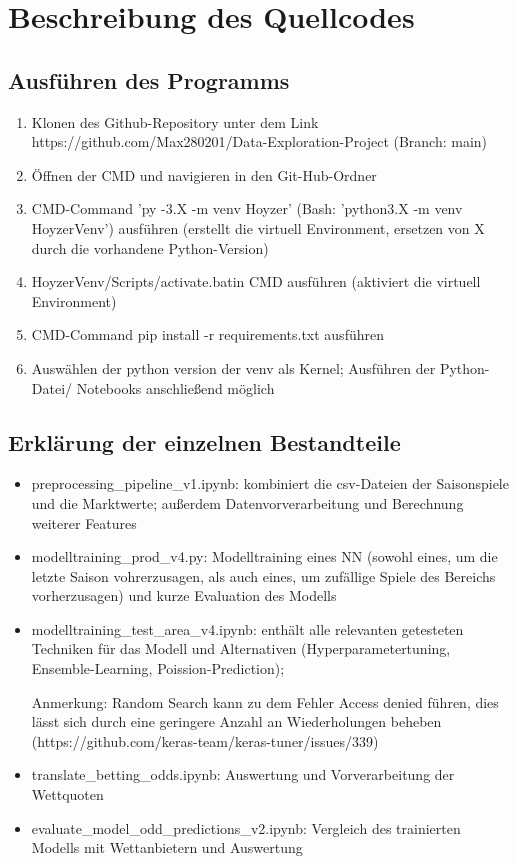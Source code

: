 \chapter{Beschreibung des Quellcodes}
\section{Ausführen des Programms}
\begin{enumerate}
	\item Klonen des Github-Repository unter dem Link https://github.com/Max280201/Data-Exploration-Project (Branch: main)
	\item Öffnen der CMD und navigieren in den Git-Hub-Ordner
	\item CMD-Command 'py -3.X -m venv Hoyzer' (Bash: 'python3.X -m venv HoyzerVenv') ausführen (erstellt die virtuell Environment, ersetzen von X durch die vorhandene Python-Version)
	\item \grqq HoyzerVenv/Scripts/activate.bat\grqq in CMD ausführen (aktiviert die virtuell Environment)
	\item CMD-Command \grqq pip install -r requirements.txt\grqq{} ausführen
	\item Auswählen der python version der venv als Kernel; Ausführen der Python-Datei/ Notebooks anschließend möglich
\end{enumerate}

\section{Erklärung der einzelnen Bestandteile}
\begin{itemize}
	\item preprocessing\_pipeline\_v1.ipynb: kombiniert die csv-Dateien der Saisonspiele und die Marktwerte; außerdem Datenvorverarbeitung und Berechnung weiterer Features
	\item modelltraining\_prod\_v4.py: Modelltraining eines NN (sowohl eines, um die letzte Saison vohrerzusagen, als auch eines, um zufällige Spiele des Bereichs vorherzusagen) und kurze Evaluation des Modells
	\item modelltraining\_test\_area\_v4.ipynb: enthält alle relevanten getesteten Techniken für das Modell und Alternativen (Hyperparametertuning, Ensemble-Learning, Poission-Prediction);
	
	Anmerkung: Random Search kann zu dem Fehler \grqq Access denied\grqq{} führen, dies lässt sich durch eine geringere Anzahl an Wiederholungen beheben (https://github.com/keras-team/keras-tuner/issues/339)
	
	\item translate\_betting\_odds.ipynb: Auswertung und Vorverarbeitung der Wettquoten
	\item evaluate\_model\_odd\_predictions\_v2.ipynb: Vergleich des trainierten Modells mit Wettanbietern und Auswertung
\end{itemize}